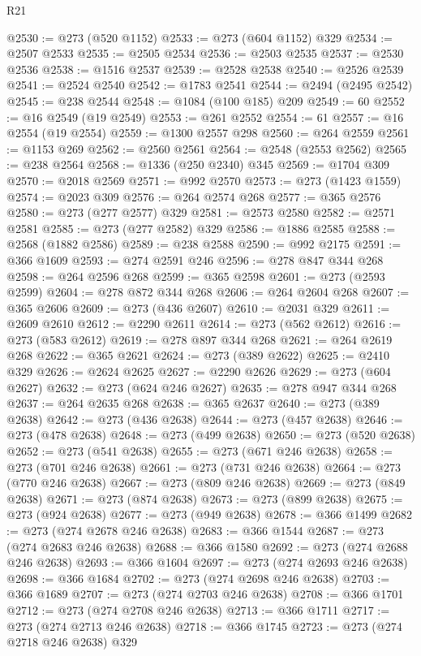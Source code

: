 \begin{lexlean}{R21}
\begin{coremodule}
{{{{{{{{{{{{{{{{{{{@2530 := @273 (@520 @1152)
@2533 := @273 (@604 @1152) @329
@2534 := @2507 @2533
@2535 := @2505 @2534
@2536 := @2503 @2535
@2537 := @2530 @2536
@2538 := @1516 @2537
@2539 := @2528 @2538
@2540 := @2526 @2539
@2541 := @2524 @2540
@2542 := @1783 @2541
@2544 := @2494 (@2495 @2542)
@2545 := @238 @2544
@2548 := @1084 (@100 @185) @209
@2549 := 60
@2552 := @16 @2549 (@19 @2549)
@2553 := @261 @2552
@2554 := 61
@2557 := @16 @2554 (@19 @2554)
@2559 := @1300 @2557 @298
@2560 := @264 @2559
@2561 := @1153 @269
@2562 := @2560 @2561
@2564 := @2548 (@2553 @2562)
@2565 := @238 @2564
@2568 := @1336 (@250 @2340) @345
@2569 := @1704 @309
@2570 := @2018 @2569
@2571 := @992 @2570
@2573 := @273 (@1423 @1559)
@2574 := @2023 @309
@2576 := @264 @2574 @268
@2577 := @365 @2576
@2580 := @273 (@277 @2577) @329
@2581 := @2573 @2580
@2582 := @2571 @2581
@2585 := @273 (@277 @2582) @329
@2586 := @1886 @2585
@2588 := @2568 (@1882 @2586)
@2589 := @238 @2588
@2590 := @992 @2175
@2591 := @366 @1609
@2593 := @274 @2591 @246
@2596 := @278 @847 @344 @268
@2598 := @264 @2596 @268
@2599 := @365 @2598
@2601 := @273 (@2593 @2599)
@2604 := @278 @872 @344 @268
@2606 := @264 @2604 @268
@2607 := @365 @2606
@2609 := @273 (@436 @2607)
@2610 := @2031 @329
@2611 := @2609 @2610
@2612 := @2290 @2611
@2614 := @273 (@562 @2612)
@2616 := @273 (@583 @2612)
@2619 := @278 @897 @344 @268
@2621 := @264 @2619 @268
@2622 := @365 @2621
@2624 := @273 (@389 @2622)
@2625 := @2410 @329
@2626 := @2624 @2625
@2627 := @2290 @2626
@2629 := @273 (@604 @2627)
@2632 := @273 (@624 @246 @2627)
@2635 := @278 @947 @344 @268
@2637 := @264 @2635 @268
@2638 := @365 @2637
@2640 := @273 (@389 @2638)
@2642 := @273 (@436 @2638)
@2644 := @273 (@457 @2638)
@2646 := @273 (@478 @2638)
@2648 := @273 (@499 @2638)
@2650 := @273 (@520 @2638)
@2652 := @273 (@541 @2638)
@2655 := @273 (@671 @246 @2638)
@2658 := @273 (@701 @246 @2638)
@2661 := @273 (@731 @246 @2638)
@2664 := @273 (@770 @246 @2638)
@2667 := @273 (@809 @246 @2638)
@2669 := @273 (@849 @2638)
@2671 := @273 (@874 @2638)
@2673 := @273 (@899 @2638)
@2675 := @273 (@924 @2638)
@2677 := @273 (@949 @2638)
@2678 := @366 @1499
@2682 := @273 (@274 @2678 @246 @2638)
@2683 := @366 @1544
@2687 := @273 (@274 @2683 @246 @2638)
@2688 := @366 @1580
@2692 := @273 (@274 @2688 @246 @2638)
@2693 := @366 @1604
@2697 := @273 (@274 @2693 @246 @2638)
@2698 := @366 @1684
@2702 := @273 (@274 @2698 @246 @2638)
@2703 := @366 @1689
@2707 := @273 (@274 @2703 @246 @2638)
@2708 := @366 @1701
@2712 := @273 (@274 @2708 @246 @2638)
@2713 := @366 @1711
@2717 := @273 (@274 @2713 @246 @2638)
@2718 := @366 @1745
@2723 := @273 (@274 @2718 @246 @2638) @329
}}}}}}}}}}}}}}}}}}}
\end{coremodule}
\end{lexlean}
